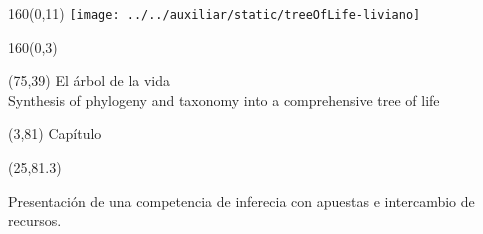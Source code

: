 \documentclass[shownotes,aspectratio=169]{beamer}
\newcounter{capitulo}
\newcommand{\unidad}{\thecapitulo \stepcounter{capitulo}}
\begin{document}
\begin{frame}
\end{frame}


\begin{frame}

\begin{textblock}{160}(0,11)  \centering
\texttt{[image: ../../auxiliar/static/treeOfLife-liviano]}
\end{textblock}

\begin{textblock}{160}(0,3) \centering
\LARGE \textcolor{black!85}{}
\end{textblock}



\begin{textblock}{55}(75,39)
\textcolor{black!85}{\normalsize El árbol de la vida \\
\fontsize{2}{0}\selectfont Synthesis of phylogeny and taxonomy into a comprehensive tree of life \\}
\end{textblock}


\begin{textblock}{55}(3,81)
\textcolor{black!85}{Capítulo \unidad}
\end{textblock}

\begin{textblock}{55}(25,81.3)
\begin{turn}{0}
\parbox{15cm}{\small \textcolor{black!85}{Presentación de una competencia de inferecia con apuestas e intercambio de recursos.}
}
\end{turn}
\end{textblock}

\end{frame}
\end{document}
